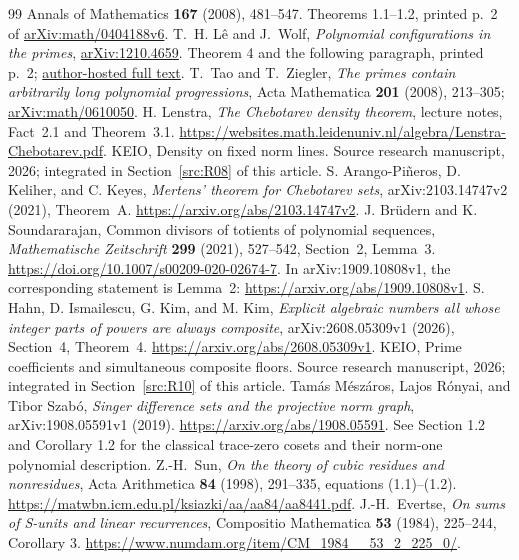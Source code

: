 \documentclass[11pt,a4paper]{article}
\theoremstyle{definition}\newtheorem{definition}[theorem]{Definition}
\theoremstyle{remark}\newtheorem{remark}[theorem]{Remark}
\begin{document}
\begin{thebibliography}{99}
Annals of Mathematics \textbf{167} (2008), 481--547.
Theorems 1.1--1.2, printed p.~2 of
\href{https://arxiv.org/pdf/math/0404188v6}{arXiv:math/0404188v6}.
T.~H. L\^e and J.~Wolf, \emph{Polynomial configurations in the primes},
\href{https://arxiv.org/abs/1210.4659}{arXiv:1210.4659}.
Theorem 4 and the following paragraph, printed p.~2;
\href{https://home.olemiss.edu/~leth/papers/appd.pdf}{author-hosted full text}.
T.~Tao and T.~Ziegler,
\emph{The primes contain arbitrarily long polynomial progressions},
Acta Mathematica \textbf{201} (2008), 213--305;
\href{https://arxiv.org/abs/math/0610050}{arXiv:math/0610050}.
H. Lenstra, \emph{The Chebotarev density theorem},
lecture notes, Fact~2.1 and Theorem~3.1.
\url{https://websites.math.leidenuniv.nl/algebra/Lenstra-Chebotarev.pdf}.
KEIO, Density on fixed norm lines. Source research manuscript, 2026; integrated in Section~\ref{src:R08} of this article.
S. Arango-Pi\~neros, D. Keliher, and C. Keyes,
\emph{Mertens' theorem for Chebotarev sets},
arXiv:2103.14747v2 (2021), Theorem~A.
\url{https://arxiv.org/abs/2103.14747v2}.
J. Br\"udern and K. Soundararajan,
Common divisors of totients of polynomial sequences,
\emph{Mathematische Zeitschrift} \textbf{299} (2021), 527--542,
Section~2, Lemma~3.
\url{https://doi.org/10.1007/s00209-020-02674-7}.
In arXiv:1909.10808v1, the corresponding statement is Lemma~2:
\url{https://arxiv.org/abs/1909.10808v1}.
S. Hahn, D. Ismailescu, G. Kim, and M. Kim,
\emph{Explicit algebraic numbers all whose integer parts of powers
are always composite},
arXiv:2608.05309v1 (2026), Section~4, Theorem~4.
\url{https://arxiv.org/abs/2608.05309v1}.
KEIO, Prime coefficients and simultaneous composite floors. Source research manuscript, 2026; integrated in Section~\ref{src:R10} of this article.
Tam\'as M\'esz\'aros, Lajos R\'onyai, and Tibor Szab\'o,
\emph{Singer difference sets and the projective norm graph},
arXiv:1908.05591v1 (2019).
\url{https://arxiv.org/abs/1908.05591}.
See Section 1.2 and Corollary 1.2 for the classical trace-zero cosets
and their norm-one polynomial description.
Z.-H.~Sun, \emph{On the theory of cubic residues and nonresidues},
Acta Arithmetica \textbf{84} (1998), 291--335,
equations (1.1)--(1.2).
\url{https://matwbn.icm.edu.pl/ksiazki/aa/aa84/aa8441.pdf}.
J.-H.~Evertse, \emph{On sums of S-units and linear recurrences},
Compositio Mathematica \textbf{53} (1984), 225--244, Corollary 3.
\url{https://www.numdam.org/item/CM_1984__53_2_225_0/}.

\end{thebibliography}
\end{document}

